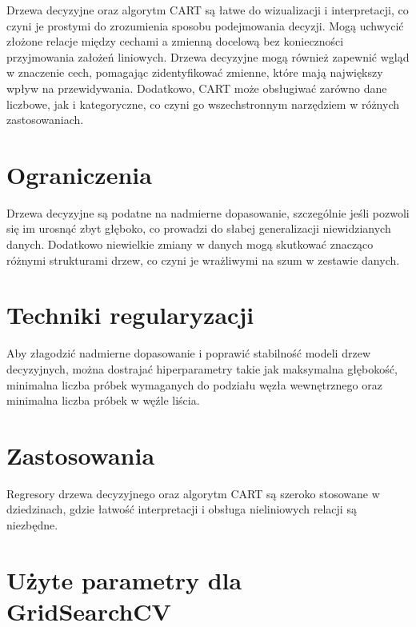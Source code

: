 Drzewa decyzyjne oraz algorytm CART są łatwe do wizualizacji i interpretacji, co czyni je prostymi do zrozumienia sposobu podejmowania decyzji. Mogą uchwycić złożone relacje między cechami a zmienną docelową bez konieczności przyjmowania założeń liniowych. Drzewa decyzyjne mogą również zapewnić wgląd w znaczenie cech, pomagając zidentyfikować zmienne, które mają największy wpływ na przewidywania.
Dodatkowo, CART może obsługiwać zarówno dane liczbowe, jak i kategoryczne, co czyni go wszechstronnym narzędziem w różnych zastosowaniach.


{}
\section*{Ograniczenia }
\vspace{-1.0em}
\label{sec:ml_challenges}

Drzewa decyzyjne są podatne na nadmierne dopasowanie, szczególnie jeśli pozwoli się im urosnąć zbyt głęboko, co prowadzi do słabej generalizacji niewidzianych danych. Dodatkowo niewielkie zmiany w danych mogą skutkować znacząco różnymi strukturami drzew, co czyni je wrażliwymi na szum w zestawie danych.

{}
\section*{Techniki regularyzacji \cite{url_DecisionTreeRegressor}}
\vspace{-1.0em}
\label{sec:ml_challenges}

Aby złagodzić nadmierne dopasowanie i poprawić stabilność modeli drzew decyzyjnych, można dostrajać hiperparametry takie jak maksymalna głębokość, minimalna liczba próbek wymaganych do podziału węzła wewnętrznego oraz minimalna liczba próbek w węźle liścia.



{}
\section*{Zastosowania}
\vspace{-0.5em}
\label{sec:ml_challenges}

Regresory drzewa decyzyjnego oraz algorytm CART są szeroko stosowane w dziedzinach, gdzie łatwość interpretacji i obsługa nieliniowych relacji są niezbędne.

{}
\section*{Użyte parametry dla GridSearchCV \cite{url_DecisionTreeRegressor, url_grid_search}}
\vspace{-1.0em}
\label{sec:ml_challenges}

